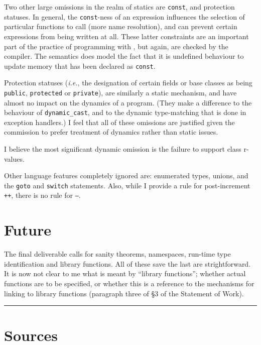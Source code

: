 \documentclass[11pt]{article}
\newcommand{\ie}{\emph{i.e.}}
\begin{document}
Two other large omissions in the realm of statics are \texttt{const},
and protection statuses.  In general, the \texttt{const}-ness of an
expression influences the selection of particular functions to call
(more name resolution), and can prevent certain expressions from being
written at all.  These latter constraints are an important part of the
practice of programming with \cpp{}, but again, are checked by the
compiler.  The semantics does model the fact that it is undefined
behaviour to update memory that has been declared as \texttt{const}.


Protection statuses (\ie, the designation of certain fields or base
classes as being \texttt{public}, \texttt{protected} or
\texttt{private}), are similarly a static mechanism, and have almost
no impact on the dynamics of a program.  (They make a difference to
the behaviour of \texttt{dynamic_cast}, and to the dynamic
type-matching that is done in exception handlers.)  I feel that all of
these omissions are justified given the commission to prefer treatment
of dynamics rather than static issues.

I believe the most significant dynamic omission is the failure to
support class r-values.

Other language features completely ignored are: enumerated types,
unions, and the \texttt{goto} and \texttt{switch} statements.  Also,
while I provide a rule for post-increment \texttt{++}, there is no
rule for \texttt{--}.

\section{Future}

The final deliverable calls for sanity theorems, namespaces, run-time
type identification and library functions.  All of these save the last
are strightforward.  It is now not clear to me what is meant by
``library functions''; whether actual functions are to be specified,
or whether this is a reference to the mechanisms for linking to
library functions (paragraph three of \S3 of the Statement of Work).

\begin{center}
\rule{0.5\textwidth}{.1mm}
\end{center}

\appendix
\section{Sources}
\label{sec:sources}
\end{document}
